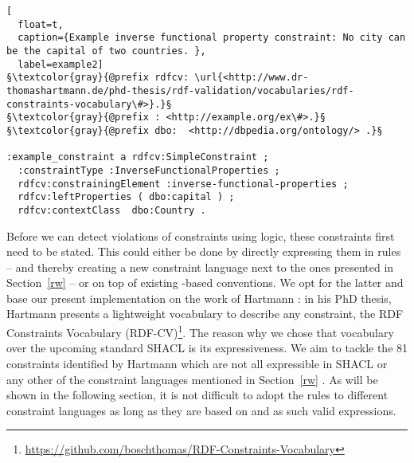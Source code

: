 \begin{lstlisting}[
  float=t,
  caption={Example inverse functional property constraint: No city can be the capital of two countries. },
  label=example2]
§\textcolor{gray}{@prefix rdfcv: \url{<http://www.dr-thomashartmann.de/phd-thesis/rdf-validation/vocabularies/rdf-constraints-vocabulary\#>}.}§
§\textcolor{gray}{@prefix : <http://example.org/ex\#>.}§
§\textcolor{gray}{@prefix dbo: 	<http://dbpedia.org/ontology/> .}§

:example_constraint a rdfcv:SimpleConstraint ;
  :constraintType :InverseFunctionalProperties ;
  rdfcv:constrainingElement :inverse-functional-properties ;
  rdfcv:leftProperties ( dbo:capital ) ;
  rdfcv:contextClass  dbo:Country .
\end{lstlisting}

Before we can detect violations of constraints using \nthree logic,
these constraints first need to be stated.
This could either be done by directly expressing them in 
rules -- and thereby creating
a new constraint language next to the ones presented in Section~\ref{rw} -- or on top of existing \rdf-based conventions. 
We opt for the latter and base our present implementation on the work of Hartmann \cite[p.167 ff]{hartmann2016}:
in his PhD thesis, Hartmann presents a lightweight vocabulary to describe any constraint, 
the RDF Constraints Vocabulary (RDF-CV)\footnote{\url{https://github.com/boschthomas/RDF-Constraints-Vocabulary}}. The reason why we chose that vocabulary over 
the upcoming standard
SHACL is its expressiveness. We aim to tackle the 81 constraints identified by Hartmann which are not all expressible in SHACL 
or any other of the constraint languages
mentioned in Section~\ref{rw} \cite[p.52, appendix]{hartmann2016}. As will be shown in the following section, it is not difficult to adopt the rules to different 
constraint languages as long as they are based on \rdf and as such valid \nthree expressions.

